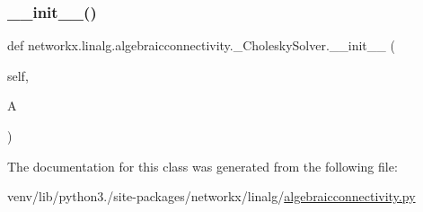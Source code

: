 \subsubsection{\texorpdfstring{\+\_\+\+\_\+init\+\_\+\+\_\+()}{\_\_init\_\_()}}
{\footnotesize\ttfamily def networkx.\+linalg.\+algebraicconnectivity.\+\_\+\+Cholesky\+Solver.\+\_\+\+\_\+init\+\_\+\+\_\+ (\begin{DoxyParamCaption}\item[{}]{self,  }\item[{}]{A }\end{DoxyParamCaption})}



The documentation for this class was generated from the following file\+:\begin{DoxyCompactItemize}
\item 
venv/lib/python3./site-\/packages/networkx/linalg/\hyperlink{algebraicconnectivity_8py}{algebraicconnectivity.\+py}\end{DoxyCompactItemize}
